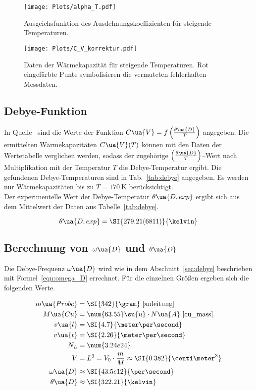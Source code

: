\begin{figure}[h]
  \centering
  \texttt{[image: Plots/alpha\_T.pdf]}
  \caption{Ausgeichsfunktion des Ausdehnungskoeffizienten für steigende Temperaturen.}
  \label{fig:alpha}
\end{figure}
\FloatBarrier
\begin{figure}
  \centering
  \texttt{[image: Plots/C\_V\_korrektur.pdf]}
  \caption{Daten der Wärmekapazität für steigende Temperaturen. Rot eingefärbte Punte symbolisieren die vermuteten fehlerhaften Messdaten.}
  \label{fig:c_v}
\end{figure}

\subsection{Debye-Funktion}

In Quelle~\cite{anleitung} sind die Werte der Funktion $C\ua{V} = f\left(\frac{\theta\ua{D}}{T}\right)$
angegeben. Die ermittelten Wärmekapazitäten $C\ua{V}(T)$ können
mit den Daten der Wertetabelle verglichen werden, sodass
der zugehörige $\left(\frac{\theta\ua{D}}{T}\right)$--Wert nach Multiplikation
mit der Temperatur $T$ die Debye-Temperatur ergibt.
Die gefundenen Debye-Temperaturen sind in Tab.~\ref{tab:debye} angegeben.
Es werden nur Wärmekapazitäten bis zu $T = \SI{170}{\kelvin}$ berücksichtigt.\\
Der experimentelle Wert der Debye-Temperatur $\theta\ua{D, exp}$ ergibt sich aus dem Mittelwert
der Daten aus Tabelle~\ref{tab:debye}.

\begin{equation}
  \label{eqn:debye}
  \theta\ua{D, exp} = \SI{279.21(6811)}{\kelvin}
\end{equation}

\subsection{Berechnung von $\omega\ua{D}$ und $\theta\ua{D}$}

Die Debye-Frequenz $\omega\ua{D}$ wird wie in dem Abschnitt~\ref{sec:debye} beschrieben mit Formel~\eqref{eqn:omega_D}
errechnet.
Für die einzelnen Größen ergeben sich die folgenden Werte.

\begin{align*}
  m\ua{Probe} &= \SI{342}{\gram} \text{~\cite{anleitung}}\\
  M\ua{Cu} &= \num{63.55}\su{u}\cdot N\ua{A} \text{~\cite{cu_mass}}\\
  v\ua{l} &= \SI{4.7}{\meter\per\second}\\
  v\ua{t} &= \SI{2.26}{\meter\per\second}\\
  N_L &= \num{3.24e24} \\
  V &= L^3 = V_0\cdot\frac{m}{M}\approx \SI{0.382}{\centi\meter^3}\\
  \omega\ua{D} &\approx \SI{43.5e12}{\per\second}\\
  \theta\ua{D} &\approx \SI{322.21}{\kelvin}
\end{align*}

